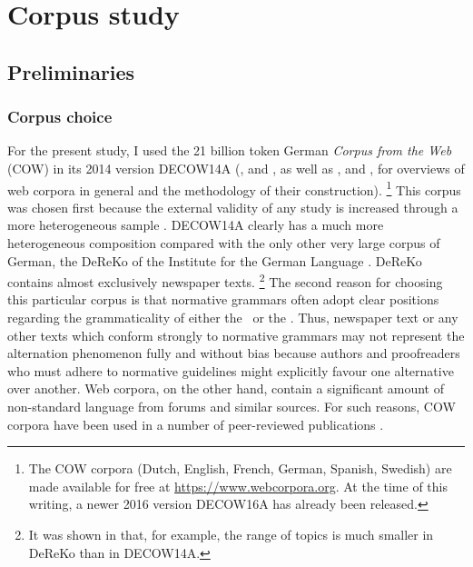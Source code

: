 \section{Corpus study}
\label{sec:corpusstudies}

\subsection{Preliminaries}

\subsubsection{Corpus choice}
\label{sec:gettingdata}

For the present study, I used the 21 billion token German \textit{Corpus from the Web} (COW) in its 2014 version DECOW14A (\citealp{SchaeferBildhauer2012full}, and \citealp{Schaefer2015b}, as well as \citealp{BiemannEa2013}, and \citealp{SchaeferBildhauer2013}, for overviews of web corpora in general and the methodology of their construction).%
\footnote{The COW corpora (Dutch, English, French, German, Spanish, Swedish) are made available for free at \url{https://www.webcorpora.org}.
At the time of this writing, a newer 2016 version DECOW16A has already been released.}
This corpus was chosen first because the external validity of any study is increased through a more heterogeneous sample \citep[30]{MaxwellDelaney2004}.
DECOW14A clearly has a much more heterogeneous composition compared with the only other very large corpus of German, the DeReKo of the Institute for the German Language \citep{KupietzEa2010}.
DeReKo contains almost exclusively newspaper texts.%
\footnote{It was shown in \cite{W16-2601} that, for example, the range of topics is much smaller in DeReKo than in DECOW14A.}
The second reason for choosing this particular corpus is that normative grammars often adopt clear positions regarding the grammaticality of either the \NACa\ or the \PGCa.
Thus, newspaper text or any other texts which conform strongly to normative grammars may not represent the alternation phenomenon fully and without bias because authors and proofreaders who must adhere to normative guidelines might explicitly favour one alternative over another.
Web corpora, on the other hand, contain a significant amount of non-standard language from forums and similar sources.
For such reasons, COW corpora have been used in a number of peer-reviewed publications \citep{VanGoethemHiligsmann2014,VanGoethemHuening2015,MuellerS2014,Schaefer2016c,SchaeferSayatz2014,SchaeferSayatz2016,Zimmer2015}.


